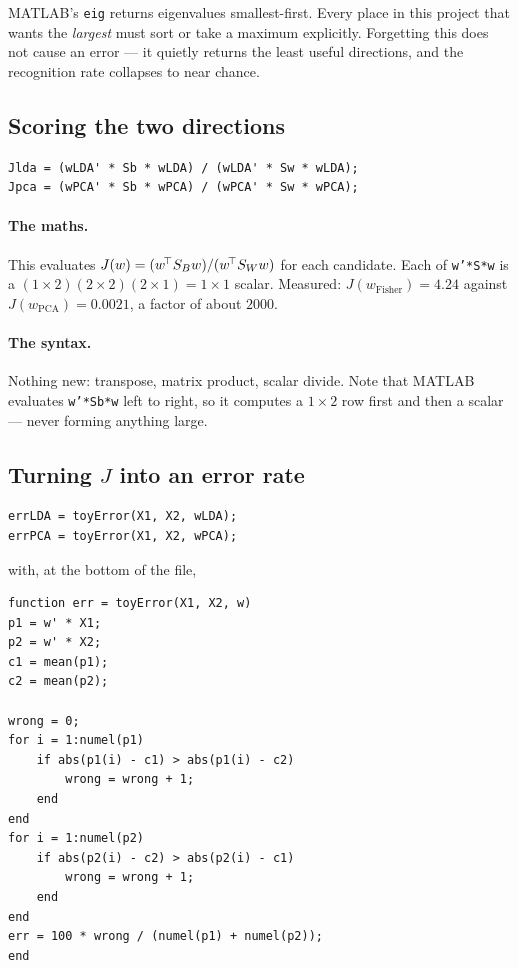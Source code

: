 \begin{gotcha}
MATLAB's \texttt{eig} returns eigenvalues smallest-first. Every place in this
project that wants the \emph{largest} must sort or take a maximum explicitly.
Forgetting this does not cause an error --- it quietly returns the least
useful directions, and the recognition rate collapses to near chance.
\end{gotcha}

\subsection{Scoring the two directions}

\begin{lstlisting}
Jlda = (wLDA' * Sb * wLDA) / (wLDA' * Sw * wLDA);
Jpca = (wPCA' * Sb * wPCA) / (wPCA' * Sw * wPCA);
\end{lstlisting}

\paragraph{The maths.} This evaluates $J(w) = (w^{\!\top}S_B w)/(w^{\!\top}S_W w)$
for each candidate. Each of \texttt{w'*S*w} is a
$(1\times2)(2\times2)(2\times1) = 1\times1$ scalar. Measured:
$J(w_{\text{Fisher}}) = 4.24$ against $J(w_{\text{PCA}}) = 0.0021$, a factor of
about $2000$.

\paragraph{The syntax.} Nothing new: transpose, matrix product, scalar divide.
Note that MATLAB evaluates \texttt{w'*Sb*w} left to right, so it computes a
$1\times2$ row first and then a scalar --- never forming anything large.

\subsection{Turning $J$ into an error rate}

\begin{lstlisting}
errLDA = toyError(X1, X2, wLDA);
errPCA = toyError(X1, X2, wPCA);
\end{lstlisting}

with, at the bottom of the file,

\begin{lstlisting}
function err = toyError(X1, X2, w)
p1 = w' * X1;
p2 = w' * X2;
c1 = mean(p1);
c2 = mean(p2);

wrong = 0;
for i = 1:numel(p1)
    if abs(p1(i) - c1) > abs(p1(i) - c2)
        wrong = wrong + 1;
    end
end
for i = 1:numel(p2)
    if abs(p2(i) - c2) > abs(p2(i) - c1)
        wrong = wrong + 1;
    end
end
err = 100 * wrong / (numel(p1) + numel(p2));
end
\end{lstlisting}

